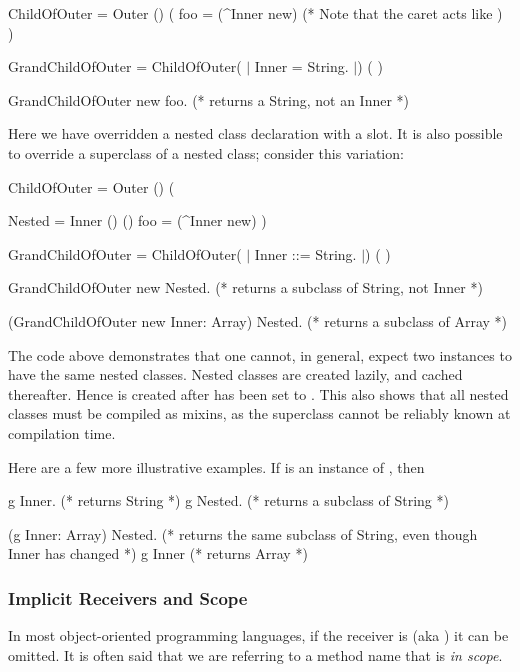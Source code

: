\documentclass{article}
\begin{document}
\begin{newspeak}
\CLASS ChildOfOuter = Outer () (
       \PUBLIC foo = (\^{}Inner new) (* Note that the caret  acts like  \RETURN *)
)

\CLASS GrandChildOfOuter = ChildOfOuter( $|$ \PUBLIC Inner = String. $|$) (
)

GrandChildOfOuter new foo. (* returns a String, not an Inner *)
\end{newspeak}

Here we have overridden a nested class declaration with a slot.  It is also possible to override a superclass of a nested class; consider this variation:

\begin{newspeak}
\CLASS ChildOfOuter = Outer () (

    \PUBLIC \CLASS Nested = Inner () ()
    \PUBLIC foo = (\^{}Inner new)
)

\CLASS GrandChildOfOuter = ChildOfOuter( $|$ \PUBLIC Inner ::= String. $|$) (
)

GrandChildOfOuter new Nested. (* returns a subclass of String, not Inner *)

(GrandChildOfOuter new Inner: Array) Nested. (* returns a subclass of Array *)
\end{newspeak}

The code above demonstrates that one cannot, in general, expect two instances to have the same nested classes. Nested classes are created lazily, and cached thereafter. Hence  is created after  has been set to . This also shows that all nested classes must be compiled as mixins, as the superclass cannot be reliably known at compilation time.

Here are a few more illustrative examples. If  is an instance of , then 

\begin{newspeak}

g Inner. (* returns String *)
g Nested. (* returns a subclass of String *)

(g Inner: Array) Nested. (* returns the same subclass of String, even though Inner has changed *)
g Inner (* returns Array *)
\end{newspeak}

\subsubsection{Implicit Receivers and Scope}

In most object-oriented programming languages, if the receiver is \SELF{} (aka \THIS{}) it can be omitted. It is often said that we are referring to a method name that is {\em in scope}.
\end{document}
